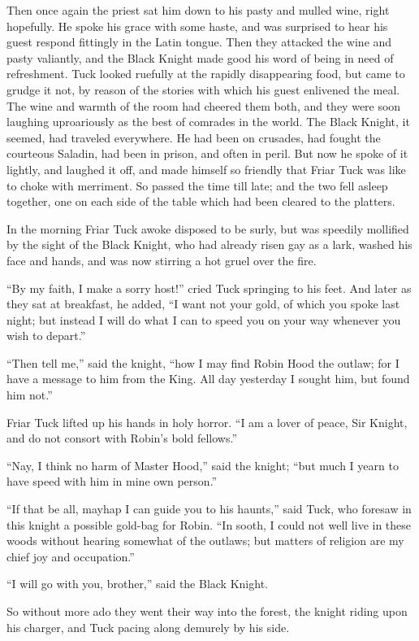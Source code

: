 Then once again the priest sat him down to his pasty and mulled wine,
right hopefully. He spoke his grace with some haste, and was surprised
to hear his guest respond fittingly in the Latin tongue. Then they
attacked the wine and pasty valiantly, and the Black Knight made good
his word of being in need of refreshment. Tuck looked ruefully at the
rapidly disappearing food, but came to grudge it not, by reason of the
stories with which his guest enlivened the meal. The wine and warmth of
the room had cheered them both, and they were soon laughing uproariously
as the best of comrades in the world. The Black Knight, it seemed, had
traveled everywhere. He had been on crusades, had fought the courteous
Saladin, had been in prison, and often in peril. But now he spoke of it
lightly, and laughed it off, and made himself so friendly that Friar
Tuck was like to choke with merriment. So passed the time till late; and
the two fell asleep together, one on each side of the table which had
been cleared to the platters.

In the morning Friar Tuck awoke disposed to be surly, but was speedily
mollified by the sight of the Black Knight, who had already risen gay as
a lark, washed his face and hands, and was now stirring a hot gruel over
the fire.

``By my faith, I make a sorry host!'' cried Tuck springing to his feet.
And later as they sat at breakfast, he added, ``I want not your gold, of
which you spoke last night; but instead I will do what I can to speed
you on your way whenever you wish to depart.''

``Then tell me,'' said the knight, ``how I may find Robin Hood the
outlaw; for I have a message to him from the King. All day yesterday I
sought him, but found him not.''

Friar Tuck lifted up his hands in holy horror. ``I am a lover of peace,
Sir Knight, and do not consort with Robin's bold fellows.''

``Nay, I think no harm of Master Hood,'' said the knight; ``but much I
yearn to have speed with him in mine own person.''

``If that be all, mayhap I can guide you to his haunts,'' said Tuck, who
foresaw in this knight a possible gold-bag for Robin. ``In sooth, I
could not well live in these woods without hearing somewhat of the
outlaws; but matters of religion are my chief joy and occupation.''

``I will go with you, brother,'' said the Black Knight.

So without more ado they went their way into the forest, the knight
riding upon his charger, and Tuck pacing along demurely by his side.

